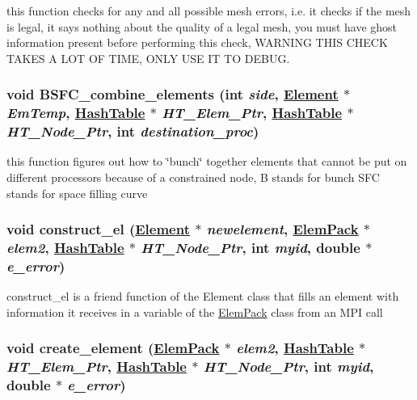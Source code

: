 this function checks for any and all possible mesh errors, i.e. it checks if the mesh is legal, it says nothing about the quality of a legal mesh, you must have ghost information present before performing this check, WARNING THIS CHECK TAKES A LOT OF TIME, ONLY USE IT TO DEBUG. 

\hypertarget{classElement_n9}{
\subsubsection[BSFC\_\-combine\_\-elements]{\setlength{\rightskip}{0pt plus 5cm}void BSFC\_\-combine\_\-elements (int {\em side}, \hyperlink{classElement}{Element} $\ast$ {\em Em\-Temp}, \hyperlink{classHashTable}{Hash\-Table} $\ast$ {\em HT\_\-Elem\_\-Ptr}, \hyperlink{classHashTable}{Hash\-Table} $\ast$ {\em HT\_\-Node\_\-Ptr}, int {\em destination\_\-proc})}}
\label{classElement_n9}


this function figures out how to \char`\"{}bunch\char`\"{} together elements that cannot be put on different processors because of a constrained node, B stands for bunch SFC stands for space filling curve 

\hypertarget{classElement_n13}{
\subsubsection[construct\_\-el]{\setlength{\rightskip}{0pt plus 5cm}void construct\_\-el (\hyperlink{classElement}{Element} $\ast$ {\em newelement}, \hyperlink{structElemPack}{Elem\-Pack} $\ast$ {\em elem2}, \hyperlink{classHashTable}{Hash\-Table} $\ast$ {\em HT\_\-Node\_\-Ptr}, int {\em myid}, double $\ast$ {\em e\_\-error})}}
\label{classElement_n13}


construct\_\-el is a friend function of the Element class that fills an element with information it receives in a variable of the \hyperlink{structElemPack}{Elem\-Pack} class from an MPI call 

\hypertarget{classElement_n12}{
\subsubsection[create\_\-element]{\setlength{\rightskip}{0pt plus 5cm}void create\_\-element (\hyperlink{structElemPack}{Elem\-Pack} $\ast$ {\em elem2}, \hyperlink{classHashTable}{Hash\-Table} $\ast$ {\em HT\_\-Elem\_\-Ptr}, \hyperlink{classHashTable}{Hash\-Table} $\ast$ {\em HT\_\-Node\_\-Ptr}, int {\em myid}, double $\ast$ {\em e\_\-error})}}
\label{classElement_n12}



